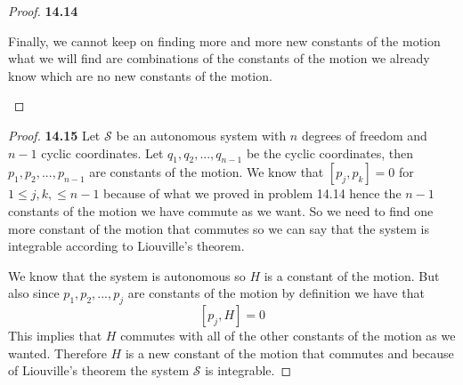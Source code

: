 \documentclass[11pt]{article}
\theoremstyle{definition}
\begin{document}
\begin{proof}{\textbf{14.14}}
\begin{itemize}
        Finally, we cannot keep on finding more and more new constants of
        the motion what we will find are combinations of the constants of
        the motion we already know which are no new constants of the motion.
    \end{itemize}
\end{proof}
\begin{proof}{\textbf{14.15}}
    Let $\mathcal{S}$ be an autonomous system with $n$ degrees of freedom
    and $n - 1$ cyclic coordinates. Let $q_1, q_2, ..., q_{n-1}$ be the
    cyclic coordinates, then $p_1, p_2, ..., p_{n-1}$ are constants of the
    motion.
    We know that $[p_j, p_k] = 0$  for $1 \leq j,k, \leq n-1$
    because of what we proved
    in problem 14.14 hence the $n-1$ constants of the motion we have commute
    as we want. So we need to find one more constant of the motion that commutes
    so we can say that the system is integrable according to Liouville's theorem.

    We know that the system is autonomous so $H$ is a constant of the motion.
    But also since $p_1, p_2, ..., p_j$ are constants of the motion
    by definition we have that
    $$[p_j, H] = 0$$
    This implies that $H$ commutes with all of the other constants of the motion
    as we wanted.
    Therefore $H$ is a new constant of the motion that commutes and because
    of Liouville's theorem the system $\mathcal{S}$ is integrable.
\end{proof}
\cleardoublepage
\end{document}
